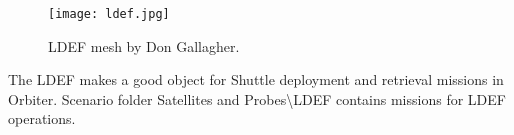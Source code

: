 \documentclass[Orbiter User Manual.tex]{subfiles}
\begin{document}
\begin{figure}[H]
  \centering
  \texttt{[image: ldef.jpg]}
  \caption{LDEF mesh by Don Gallagher.}
\end{figure}

\noindent
The LDEF makes a good object for Shuttle deployment and retrieval missions in Orbiter. Scenario folder Satellites and Probes\textbackslash LDEF contains missions for LDEF operations.
\end{document}
